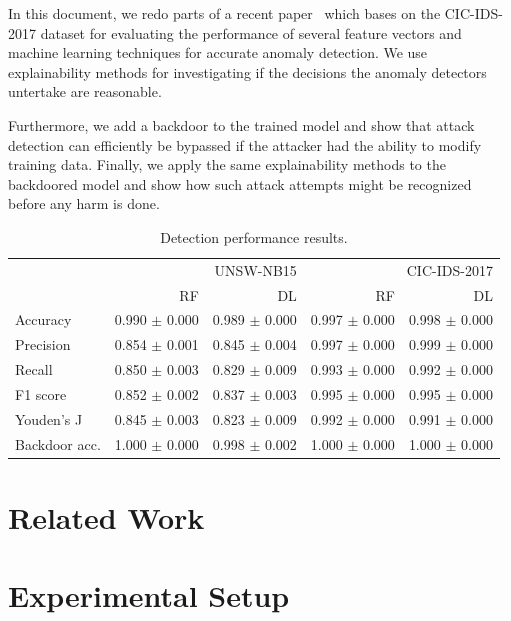 \documentclass[10pt,sigconf,letterpaper,dvipsnames]{acmart}
\begin{document}
In this document, we redo parts of a recent paper~\cite{meghdouri_analysis_2018} which bases on the CIC-IDS-2017 dataset \cite{sharafaldin_toward_2018} for evaluating the performance of several feature vectors and machine learning techniques for accurate anomaly detection. We use explainability methods for investigating if the decisions the anomaly detectors untertake are reasonable.

Furthermore, we add a backdoor to the trained model and show that attack detection can efficiently be bypassed if the attacker had the ability to modify training data. Finally, we apply the same explainability methods to the backdoored model and show how such attack attempts might be recognized before any harm is done.


\begin{table}[b]
\caption{Detection performance results.} \label{tab:performance_results}
\begin{tabular}{l r r r r} \toprule
& \multicolumn{2}{r}{UNSW-NB15} & \multicolumn{2}{r}{CIC-IDS-2017} \\
& RF & DL & RF & DL \\ \midrule
Accuracy	& 0.990 $\pm$ 0.000	& 0.989 $\pm$ 0.000	& 0.997 $\pm$ 0.000	& 0.998 $\pm$ 0.000	\\
Precision	& 0.854 $\pm$ 0.001	& 0.845 $\pm$ 0.004	& 0.997 $\pm$ 0.000	& 0.999 $\pm$ 0.000	\\
Recall	& 0.850 $\pm$ 0.003	& 0.829 $\pm$ 0.009	& 0.993 $\pm$ 0.000	& 0.992 $\pm$ 0.000	\\
F1 score	& 0.852 $\pm$ 0.002	& 0.837 $\pm$ 0.003	& 0.995 $\pm$ 0.000	& 0.995 $\pm$ 0.000	\\
Youden's J	& 0.845 $\pm$ 0.003	& 0.823 $\pm$ 0.009	& 0.992 $\pm$ 0.000	& 0.991 $\pm$ 0.000	\\
Backdoor acc.	& 1.000 $\pm$ 0.000	& 0.998 $\pm$ 0.002	& 1.000 $\pm$ 0.000	& 1.000 $\pm$ 0.000	\\


\bottomrule
\end{tabular}
\end{table}

\section{Related Work}

\section{Experimental Setup} \label{sec:ml_approaches}
\end{document}
